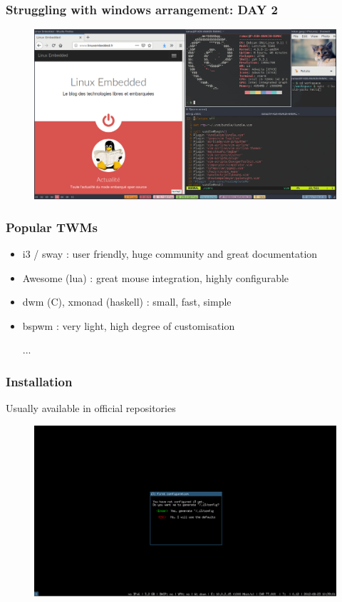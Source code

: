 \documentclass[aspectratio=169]{beamer}
\begin{document}
\begin{frame}
    \frametitle{Struggling with windows arrangement: DAY 2}
    \begin{figure}[h]
        \includegraphics[scale=0.23]{./images/organized_wp.png}
    \end{figure}
\end{frame}

\begin{frame}
    \frametitle{Popular TWMs}
    \begin{itemize}
      \item i3 / sway : user friendly, huge community and great documentation
      \item Awesome (lua) : great mouse integration, highly configurable
      \item dwm (C), xmonad (haskell) : small, fast, simple
      \item bspwm : very light, high degree of customisation
      \item [...]
    \end{itemize}
\end{frame}

\begin{frame}
    \frametitle{Installation}
    Usually available in official repositories
    \begin{figure}[h]
        \includegraphics[scale=0.23]{./images/i3starting.png}
    \end{figure}
\end{frame}
\end{document}
